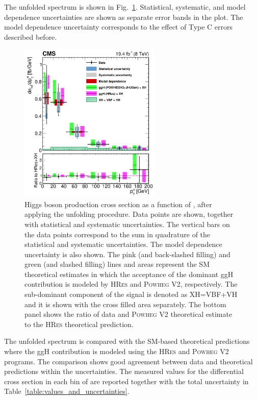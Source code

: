 The unfolded \pth spectrum is shown in Fig.~\ref{fig:unfolded}. Statistical, systematic, and model dependence uncertainties are shown as separate error bands in the plot. The model dependence uncertainty corresponds to the effect of Type C errors described before.
\begin{figure}[htb]
\centering
\includegraphics[width=0.6\textwidth]{images/unblinding/pthRatio_unfolded_paper.pdf}
\caption{Higgs boson production cross section as a function of \pth{}, after applying the unfolding procedure.
Data points are shown, together with statistical and systematic uncertainties. The vertical bars on the data points correspond to the sum in quadrature of the statistical and systematic uncertainties. The model dependence uncertainty is also shown.
The pink (and back-slashed filling) and green (and slashed filling) lines and areas represent the SM theoretical estimates in which the acceptance of the dominant ggH contribution is modeled by \textsc{HRes} and \textsc{Powheg V2}, respectively. The sub-dominant component of the signal is denoted as XH=VBF+VH and it is shown with the cross filled area separately. The bottom panel shows the ratio of data and \textsc{Powheg V2} theoretical estimate to the \textsc{HRes} theoretical prediction.}\label{fig:unfolded}
\end{figure}

The unfolded spectrum is compared with the SM-based theoretical predictions where the ggH contribution is modeled using the \textsc{HRes} and \textsc{Powheg V2} programs. The comparison shows good agreement between data and theoretical predictions within the uncertainties.
The measured values for the differential cross section in each bin of \pth are reported together with the total uncertainty in Table~\ref{table:values_and_uncertainties}.


